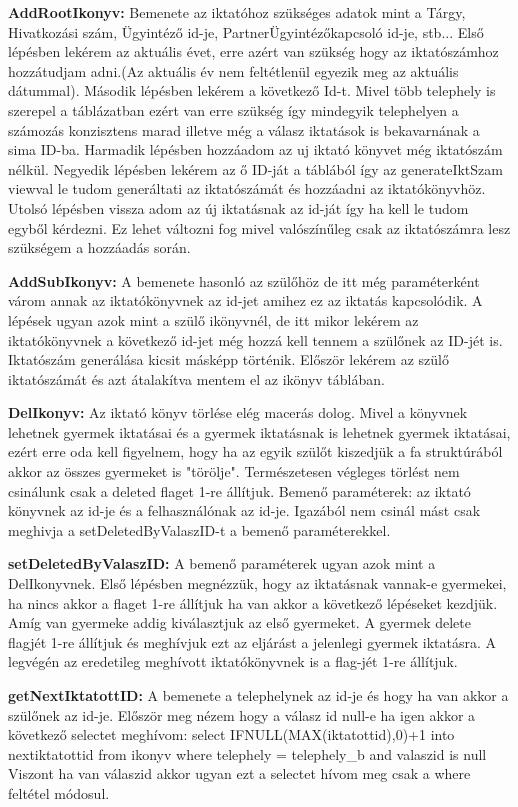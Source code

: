 \documentclass[conference]{IEEEtran}
\begin{document}
\textbf{AddRootIkonyv:}
	Bemenete az iktatóhoz szükséges adatok mint a Tárgy, Hivatkozási szám, Ügyintéző id-je, PartnerÜgyintézőkapcsoló id-je, stb... Első lépésben lekérem az aktuális évet, erre azért van szükség hogy az iktatószámhoz hozzátudjam adni.(Az aktuális év nem feltétlenül egyezik meg az aktuális dátummal). Második lépésben lekérem a következő Id-t. Mivel több telephely is szerepel a táblázatban ezért van erre szükség így mindegyik telephelyen a számozás konzisztens marad illetve még a válasz iktatások is bekavarnának a sima ID-ba. Harmadik lépésben hozzáadom az uj iktató könyvet még iktatószám nélkül. Negyedik lépésben lekérem az ő ID-ját a táblából így az generateIktSzam viewval le tudom generáltati az iktatószámát és hozzáadni az iktatókönyvhöz. Utolsó lépésben vissza adom az új iktatásnak az id-ját így ha kell le tudom egyből kérdezni. Ez lehet változni fog mivel valószínűleg csak az iktatószámra lesz szükségem a hozzáadás során.

\textbf{AddSubIkonyv:}
 	A bemenete hasonló az szülőhöz de itt még paraméterként várom annak az iktatókönyvnek az id-jet amihez ez az iktatás kapcsolódik. A lépések ugyan azok mint a szülő ikönyvnél, de itt mikor lekérem az iktatókönyvnek a következő id-jet még hozzá kell tennem a szülőnek az ID-jét is. Iktatószám generálása kicsit másképp történik. Először lekérem az szülő  iktatószámát és azt átalakítva mentem el az ikönyv táblában.
 	
\textbf{DelIkonyv:}
 Az iktató könyv törlése elég macerás dolog. Mivel a könyvnek lehetnek gyermek iktatásai és a gyermek iktatásnak is lehetnek gyermek iktatásai, ezért erre oda kell figyelnem, hogy ha az egyik szülőt kiszedjük a fa struktúrából akkor az összes gyermeket is "törölje". Természetesen végleges törlést nem csinálunk csak a deleted flaget 1-re állítjuk.
 Bemenő paraméterek: az iktató könyvnek az id-je és a felhasználónak az id-je. Igazából nem csinál mást csak meghivja a setDeletedByValaszID-t a bemenő paraméterekkel.

\textbf{setDeletedByValaszID:}
 A bemenő paraméterek ugyan azok mint a DelIkonyvnek. Első lépésben megnézzük, hogy az iktatásnak vannak-e gyermekei, ha nincs akkor a flaget 1-re állítjuk ha van akkor a következő lépéseket kezdjük. Amíg van gyermeke addig kiválasztjuk az első gyermeket. A gyermek delete flagjét 1-re állítjuk és meghívjuk ezt az eljárást a jelenlegi gyermek iktatásra. A legvégén az eredetileg meghívott iktatókönyvnek is a flag-jét 1-re állítjuk. 
 
 \textbf{getNextIktatottID:}
 A bemenete a telephelynek az id-je és hogy ha van akkor a szülőnek az id-je. Először meg nézem hogy a válasz id null-e ha igen akkor a következő selectet meghívom:  select IFNULL(MAX(iktatottid),0)+1 into nextiktatottid from ikonyv where telephely = telephely\_b and valaszid is null\;
 Viszont ha van válaszid akkor ugyan ezt a selectet hívom meg csak a where feltétel módosul.
 
\end{document}
